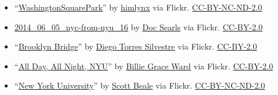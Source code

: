 \documentclass[notitlepage]{nyu22report}
\begin{document}
\begin{itemize}
    \item “\href{https://flic.kr/p/eeBz4t}{WashingtonSquarePark}” 
    by \href{https://www.flickr.com/photos/elizaroff/}{himlynx} 
    via Flickr. \href{https://creativecommons.org/licenses/by-nc-nd/2.0/}{CC-BY-NC-ND-2.0}
    \item \href{https://flic.kr/p/nA22rF}{2014\_06\_05\_nyc-from-nyu\_16}
    by \href{https://www.flickr.com/photos/docsearls/}{Doc Searls}
    via Flickr.
    \href{https://creativecommons.org/licenses/by/2.0/}{CC-BY-2.0}
    \item “\href{https://flic.kr/p/9Rm9tQ}{Brooklyn Bridge}”
    by \href{https://www.flickr.com/photos/3336/}{Diego Torres Silvestre}
    via Flickr.
    \href{https://creativecommons.org/licenses/by/2.0/}{CC-BY-2.0}
    \item “\href{https://flic.kr/p/nvr27Y}{All Day, All Night, NYU}” by \href{https://www.flickr.com/photos/wwward0/}{Billie Grace Ward} via Flickr.
    \href{https://creativecommons.org/licenses/by/2.0/}{CC-BY-2.0}
    \item “\href{https://flic.kr/p/dFkjNR}{New York University}” 
       by \href{http://scottbeale.org/}{Scott Beale} via Flickr.
    \href{https://creativecommons.org/licenses/by-nc-nd/2.0/}{CC-BY-NC-ND-2.0}
\end{itemize}
\end{document}
